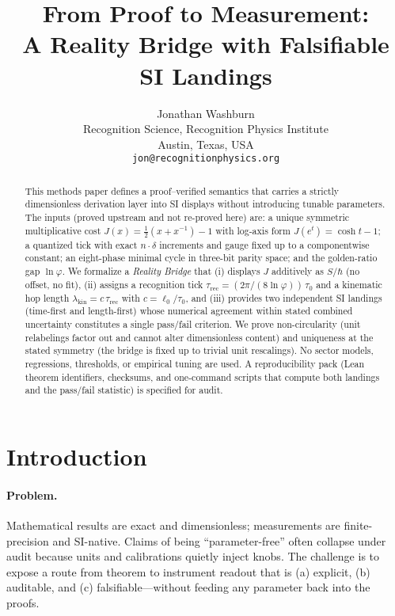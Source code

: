\documentclass[11pt]{article}
\title{From Proof to Measurement:\\
A Reality Bridge with Falsifiable SI Landings}
\author{Jonathan Washburn\\
Recognition Science, Recognition Physics Institute\\
Austin, Texas, USA\\
\texttt{jon@recognitionphysics.org}}
\date{} %
\begin{document}
\maketitle

\begin{abstract}
This methods paper defines a proof–verified semantics that carries a strictly dimensionless derivation layer into SI displays without introducing tunable parameters. The inputs (proved upstream and not re-proved here) are: a unique symmetric multiplicative cost \(J(x)=\tfrac12(x+x^{-1})-1\) with log-axis form \(J(e^{t})=\cosh t-1\); a quantized tick with exact \(n\cdot\delta\) increments and gauge fixed up to a componentwise constant; an eight-phase minimal cycle in three-bit parity space; and the golden-ratio gap \(\ln\varphi\). We formalize a \emph{Reality Bridge} that (i) displays \(J\) additively as \(S/\hbar\) (no offset, no fit), (ii) assigns a recognition tick \(\tau_{\mathrm{rec}}=(2\pi/(8\ln\varphi))\,\tau_{0}\) and a kinematic hop length \(\lambda_{\mathrm{kin}}=c\,\tau_{\mathrm{rec}}\) with \(c=\ell_{0}/\tau_{0}\), and (iii) provides two independent SI landings (time-first and length-first) whose numerical agreement within stated combined uncertainty constitutes a single pass/fail criterion. We prove non-circularity (unit relabelings factor out and cannot alter dimensionless content) and uniqueness at the stated symmetry (the bridge is fixed up to trivial unit rescalings). No sector models, regressions, thresholds, or empirical tuning are used. A reproducibility pack (Lean theorem identifiers, checksums, and one-command scripts that compute both landings and the pass/fail statistic) is specified for audit.
\end{abstract}

\section{Introduction}
\paragraph{Problem.}
Mathematical results are exact and dimensionless; measurements are finite-precision and SI-native. Claims of being “parameter-free” often collapse under audit because units and calibrations quietly inject knobs. The challenge is to expose a route from theorem to instrument readout that is (a) explicit, (b) auditable, and (c) falsifiable—without feeding any parameter back into the proofs.
\end{document}
